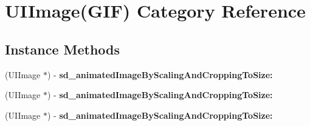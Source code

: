 \hypertarget{category_u_i_image_07_g_i_f_08}{}\section{U\+I\+Image(G\+IF) Category Reference}
\label{category_u_i_image_07_g_i_f_08}
\subsection*{Instance Methods}
\begin{DoxyCompactItemize}
\item 
\mbox{\label{category_u_i_image_07_g_i_f_08_a43192acee9cdd044e0a0d90214cf6597}} 
(U\+I\+Image $\ast$) -\/ {\bfseries sd\+\_\+animated\+Image\+By\+Scaling\+And\+Cropping\+To\+Size\+:}
\item 
\mbox{\label{category_u_i_image_07_g_i_f_08_a43192acee9cdd044e0a0d90214cf6597}} 
(U\+I\+Image $\ast$) -\/ {\bfseries sd\+\_\+animated\+Image\+By\+Scaling\+And\+Cropping\+To\+Size\+:}
\item 
\mbox{\label{category_u_i_image_07_g_i_f_08_a43192acee9cdd044e0a0d90214cf6597}} 
(U\+I\+Image $\ast$) -\/ {\bfseries sd\+\_\+animated\+Image\+By\+Scaling\+And\+Cropping\+To\+Size\+:}
\end{DoxyCompactItemize}
